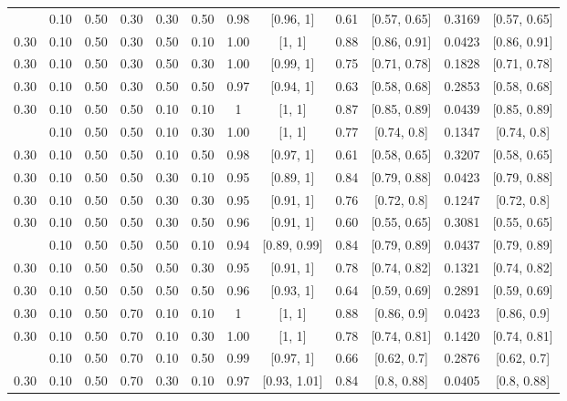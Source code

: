 \documentclass[
  11pt,
]{article}
\begin{document}
\begin{landscape}
\begin{ThreePartTable}
\begin{longtable}[t]{cccccccccccc}
\addlinespace
0.30 & 0.10 & 0.50 & 0.30 & 0.30 & 0.50 & 0.98 & {}[0.96, 1] & 0.61 & {}[0.57, 0.65] & 0.3169 & {}[0.57, 0.65]\\
0.30 & 0.10 & 0.50 & 0.30 & 0.50 & 0.10 & 1.00 & {}[1, 1] & 0.88 & {}[0.86, 0.91] & 0.0423 & {}[0.86, 0.91]\\
0.30 & 0.10 & 0.50 & 0.30 & 0.50 & 0.30 & 1.00 & {}[0.99, 1] & 0.75 & {}[0.71, 0.78] & 0.1828 & {}[0.71, 0.78]\\
0.30 & 0.10 & 0.50 & 0.30 & 0.50 & 0.50 & 0.97 & {}[0.94, 1] & 0.63 & {}[0.58, 0.68] & 0.2853 & {}[0.58, 0.68]\\
0.30 & 0.10 & 0.50 & 0.50 & 0.10 & 0.10 & 1 & {}[1, 1] & 0.87 & {}[0.85, 0.89] & 0.0439 & {}[0.85, 0.89]\\
\addlinespace
0.30 & 0.10 & 0.50 & 0.50 & 0.10 & 0.30 & 1.00 & {}[1, 1] & 0.77 & {}[0.74, 0.8] & 0.1347 & {}[0.74, 0.8]\\
0.30 & 0.10 & 0.50 & 0.50 & 0.10 & 0.50 & 0.98 & {}[0.97, 1] & 0.61 & {}[0.58, 0.65] & 0.3207 & {}[0.58, 0.65]\\
0.30 & 0.10 & 0.50 & 0.50 & 0.30 & 0.10 & 0.95 & {}[0.89, 1] & 0.84 & {}[0.79, 0.88] & 0.0423 & {}[0.79, 0.88]\\
0.30 & 0.10 & 0.50 & 0.50 & 0.30 & 0.30 & 0.95 & {}[0.91, 1] & 0.76 & {}[0.72, 0.8] & 0.1247 & {}[0.72, 0.8]\\
0.30 & 0.10 & 0.50 & 0.50 & 0.30 & 0.50 & 0.96 & {}[0.91, 1] & 0.60 & {}[0.55, 0.65] & 0.3081 & {}[0.55, 0.65]\\
\addlinespace
0.30 & 0.10 & 0.50 & 0.50 & 0.50 & 0.10 & 0.94 & {}[0.89, 0.99] & 0.84 & {}[0.79, 0.89] & 0.0437 & {}[0.79, 0.89]\\
0.30 & 0.10 & 0.50 & 0.50 & 0.50 & 0.30 & 0.95 & {}[0.91, 1] & 0.78 & {}[0.74, 0.82] & 0.1321 & {}[0.74, 0.82]\\
0.30 & 0.10 & 0.50 & 0.50 & 0.50 & 0.50 & 0.96 & {}[0.93, 1] & 0.64 & {}[0.59, 0.69] & 0.2891 & {}[0.59, 0.69]\\
0.30 & 0.10 & 0.50 & 0.70 & 0.10 & 0.10 & 1 & {}[1, 1] & 0.88 & {}[0.86, 0.9] & 0.0423 & {}[0.86, 0.9]\\
0.30 & 0.10 & 0.50 & 0.70 & 0.10 & 0.30 & 1.00 & {}[1, 1] & 0.78 & {}[0.74, 0.81] & 0.1420 & {}[0.74, 0.81]\\
\addlinespace
0.30 & 0.10 & 0.50 & 0.70 & 0.10 & 0.50 & 0.99 & {}[0.97, 1] & 0.66 & {}[0.62, 0.7] & 0.2876 & {}[0.62, 0.7]\\
0.30 & 0.10 & 0.50 & 0.70 & 0.30 & 0.10 & 0.97 & {}[0.93, 1.01] & 0.84 & {}[0.8, 0.88] & 0.0405 & {}[0.8, 0.88]\\

\end{longtable}
\end{ThreePartTable}
\end{landscape}
\end{document}

